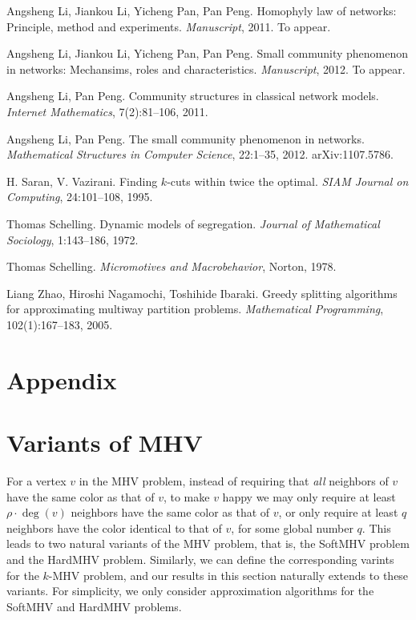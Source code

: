 \documentclass[11pt]{article}
\begin{document}
\begin{thebibliography}{99}
Angsheng Li, Jiankou Li, Yicheng Pan, Pan Peng.
Homophyly law of networks: Principle, method and experiments.
{\em Manuscript}, 2011. To appear.

Angsheng Li, Jiankou Li, Yicheng Pan, Pan Peng.
Small community phenomenon in networks: Mechansims, roles and characteristics.
{\em Manuscript}, 2012. To appear.

Angsheng Li, Pan Peng.
Community structures in classical network models.
{\em Internet Mathematics}, 7(2):81--106, 2011.

Angsheng Li, Pan Peng.
The small community phenomenon in networks.
{\em Mathematical Structures in Computer Science},
22:1--35, 2012.
arXiv:1107.5786.

H. Saran, V. Vazirani.
Finding $k$-cuts within twice the optimal.
{\em SIAM Journal on Computing}, 24:101--108, 1995.

Thomas Schelling.
Dynamic models of segregation.
{\em Journal of Mathematical Sociology}, 1:143--186, 1972.

Thomas Schelling.
{\em Micromotives and Macrobehavior}, Norton, 1978.

Liang Zhao, Hiroshi Nagamochi, Toshihide Ibaraki.
Greedy splitting algorithms for approximating multiway partition problems.
{\em Mathematical Programming}, 102(1):167--183, 2005.
\end{thebibliography}




\appendix

\section*{Appendix}




\section{Variants of MHV}
\label{sec - variants of MHV}
For a vertex $v$ in the MHV problem, instead of requiring that {\em all}
neighbors of $v$ have the same color as that of $v$, to make $v$ happy
we may only require at least $\rho \cdot \deg(v)$ neighbors have the same
color as that of $v$, or only require at least $q$ neighbors have the color
identical to that of $v$, for some global number $q$. This leads to two
natural variants of the MHV problem, that is, the SoftMHV problem and
the HardMHV problem. Similarly, we can define the corresponding varints
for the $k$-MHV problem, and our results in this section naturally extends
to these variants. For simplicity, we only consider approximation algorithms
for the SoftMHV and HardMHV problems.
\end{document}
